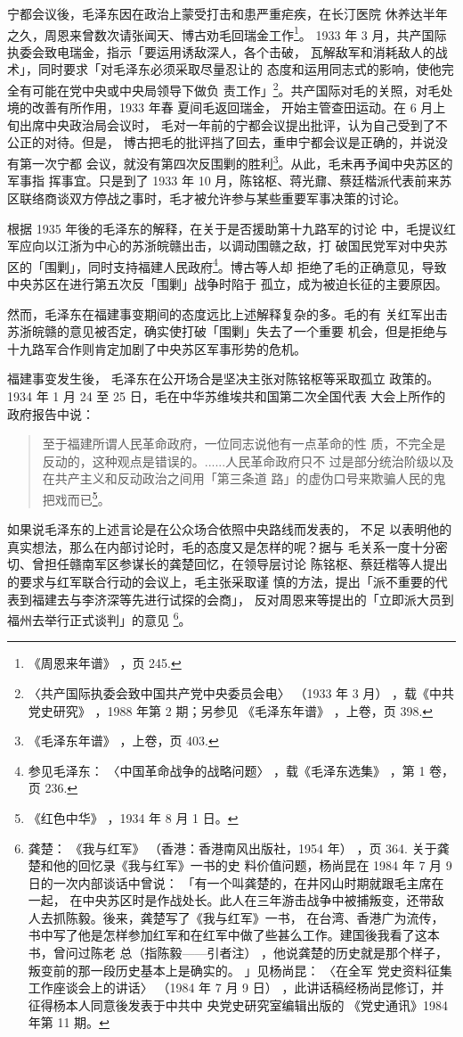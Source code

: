 宁都会议後，毛泽东因在政治上蒙受打击和患严重疟疾，在长汀医院
休养达半年之久，周恩来曾数次请张闻天、博古劝毛回瑞金工作\footnote{《周恩来年谱》
，页 245.}。 1933
年 3 月，共产国际执委会致电瑞金，指示「要运用诱敌深人，各个击破，
瓦解敌军和消耗敌人的战术」，同时要求「对毛泽东必须采取尽量忍让的
态度和运用同志式的影响，使他完全有可能在党中央或中央局领导下做负
责工作」\footnote{〈共产国际执委会致中国共产党中央委员会电〉
（1933 年 3 月）
，载《中共党史研究》
，1988 年第 2 期；另参见
《毛泽东年谱》
，上卷，页 398.}。共产国际对毛的关照，对毛处境的改善有所作用，1933 年春
夏间毛返回瑞金，
开始主管查田运动。在 6 月上旬出席中央政治局会议时，
毛对一年前的宁都会议提出批评，认为自己受到了不公正的对待。但是，
博古把毛的批评挡了回去，重申宁都会议是正确的，并说没有第一次宁都
会议，就没有第四次反围剿的胜利\footnote{《毛泽东年谱》
，上卷，页 403.}。从此，毛未再予闻中央苏区的军事指
挥事宜。只是到了 1933 年 10 月，陈铭枢、蒋光鼐、蔡廷楷派代表前来苏
区联络商谈双方停战之事时，毛才被允许参与某些重要军事决策的讨论。

根据 1935 年後的毛泽东的解释，在关于是否援助第十九路军的讨论
中，毛提议红军应向以江浙为中心的苏浙皖赣出击，以调动围赣之敌，打
破国民党军对中央苏区的「围剿」，同时支持福建人民政府\footnote{参见毛泽东：
〈中国革命战争的战略问题〉
，载《毛泽东选集》
，第 1 卷，页 236.}。博古等人却
拒绝了毛的正确意见，导致中央苏区在进行第五次反「围剿」战争时陷于
孤立，成为被迫长征的主要原因。

然而，毛泽东在福建事变期间的态度远比上述解释复杂的多。毛的有
关红军出击苏浙皖赣的意见被否定，确实使打破「围剿」失去了一个重要
机会，但是拒绝与十九路军合作则肯定加剧了中央苏区军事形势的危机。

福建事变发生後，
毛泽东在公开场合是坚决主张对陈铭枢等采取孤立
政策的。1934 年 1 月 24 至 25 日，毛在中华苏维埃共和国第二次全国代表
大会上所作的政府报告中说：
\begin{quote}
	\fzwkai 至于福建所谓人民革命政府，一位同志说他有一点革命的性
质，不完全是反动的，这种观点是错误的。......人民革命政府只不
过是部分统治阶级以及在共产主义和反动政治之间用「第三条道
路」的虚伪口号来欺骗人民的鬼把戏而已\footnote{《红色中华》
，1934 年 8 月 1 日。}。
\end{quote}

如果说毛泽东的上述言论是在公众场合依照中央路线而发表的，
不足
以表明他的真实想法，那么在内部讨论时，毛的态度又是怎样的呢？据与
毛关系一度十分密切、曾担任赣南军区参谋长的龚楚回忆，在领导层讨论
陈铭枢、蔡廷楷等人提出的要求与红军联合行动的会议上，毛主张采取谨
慎的方法，提出「派不重要的代表到福建去与李济深等先进行试探的会商」，
反对周恩来等提出的「立即派大员到福州去举行正式谈判」的意见
\footnote{龚楚：
《我与红军》
（香港：香港南风出版社，1954 年）
，页 364. 关于龚楚和他的回忆录《我与红军》一书的史
料价值问题，杨尚昆在 1984 年 7 月 9 日的一次内部谈话中曾说：
「有一个叫龚楚的，在井冈山时期就跟毛主席在一起，
在中央苏区时是作战处长。此人在三年游击战争中被捕叛变，还带敌人去抓陈毅。後来，龚楚写了《我与红军》一书，
在台湾、香港广为流传，书中写了他是怎样参加红军和在红军中做了些甚么工作。建国後我看了这本书，曾问过陈老
总（指陈毅——引者注）
，他说龚楚的历史就是那个样子，叛变前的那一段历史基本上是确实的。
」见杨尚昆：
〈在全军
党史资料征集工作座谈会上的讲话〉
（1984 年 7 月 9 日）
，此讲话稿经杨尚昆修订，并征得杨本人同意後发表于中共中
央党史研究室编辑出版的 《党史通讯》1984 年第 11 期。 }。

